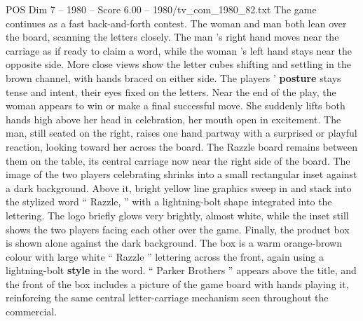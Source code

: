 \begin{textsample}{POS Dim 7 – 1980 – Score 6.00 – 1980/tv\_com\_1980\_82.txt}
The game continues as a fast back-and-forth contest.
The woman and man both lean over the board, scanning the letters closely.
The man ’s right hand moves near the carriage as if ready to claim a word, while the woman ’s left hand stays near the opposite side.
More close views show the letter cubes shifting and settling in the brown channel, with hands braced on either side.
The players ’ \textbf{posture} stays tense and intent, their eyes fixed on the letters.
Near the end of the play, the woman appears to win or make a final successful move.
She suddenly lifts both hands high above her head in celebration, her mouth open in excitement.
The man, still seated on the right, raises one hand partway with a surprised or playful reaction, looking toward her across the board.
The Razzle board remains between them on the table, its central carriage now near the right side of the board.
The image of the two players celebrating shrinks into a small rectangular inset against a dark background.
Above it, bright yellow line graphics sweep in and stack into the stylized word “ Razzle, ” with a lightning-bolt shape integrated into the lettering.
The logo briefly glows very brightly, almost white, while the inset still shows the two players facing each other over the game.
Finally, the product box is shown alone against the dark background.
The box is a warm orange-brown colour with large white “ Razzle ” lettering across the front, again using a lightning-bolt \textbf{style} in the word. “ Parker Brothers ” appears above the title, and the front of the box includes a picture of the game board with hands playing it, reinforcing the same central letter-carriage mechanism seen throughout the commercial.

\end{textsample}
